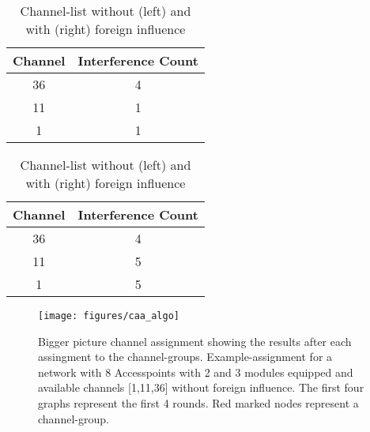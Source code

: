   \begin{table}
    \centering
    \begin{tabular}{|c|c|}\hline
      Channel & Interference Count\\ \hline
      36 & 4 \\ \hline
      11 & 1 \\ \hline
      1 & 1 \\\hline
    \end{tabular}
    \begin{tabular}{|c|c|}\hline
      Channel & Interference Count\\ \hline
      36 & 4 \\ \hline
      11 & 5 \\ \hline
      1 & 5  \\\hline
    \end{tabular}
    \caption{Channel-list without (left) and with (right) foreign influence}
  \end{table}
 
  \begin{figure}[h]
    \centering
    \texttt{[image: figures/caa\_algo]}
    \caption{Bigger picture channel assignment showing the results after each assingment to the channel-groups. 
    Example-assignment for a network with 8 Accesspoints with 2 and 3 modules equipped and available channels [1,11,36] without foreign influence. 
    The first four graphs represent the first 4 rounds. Red marked nodes represent a channel-group.}
    \label{fig:caa_algo}
  \end{figure}
